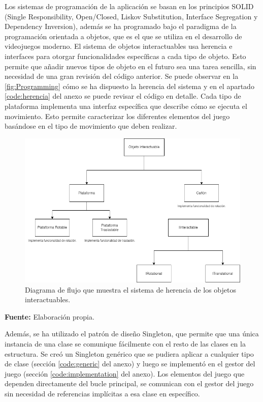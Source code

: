 Los sistemas de programación de la aplicación se basan en los principios SOLID (Single Responsibility, Open/Closed, Liskov Substitution, Interface Segregation y Dependency Inversion), además se ha programado bajo el paradigma de la programación orientada a objetos, que es el que se utiliza en el desarrollo de videojuegos moderno. El sistema de objetos interactuables usa herencia e interfaces para otorgar funcionalidades específicas a cada tipo de objeto. Esto permite que añadir nuevos tipos de objeto en el futuro sea una tarea sencilla, sin necesidad de una gran revisión del código anterior. Se puede observar en la \autoref{fig:Programming} cómo se ha dispuesto la herencia del sistema y en el apartado \ref{code:herencia} del anexo se puede revisar el código en detalle. Cada tipo de plataforma implementa una interfaz específica que describe cómo se ejecuta el movimiento. Esto permite caracterizar los diferentes elementos del juego basándose en el tipo de movimiento que deben realizar.

\begin{figure}[h!]
	\centering
	\includegraphics[width=\linewidth]{Figuras/Desarrollo/Herencia.png}
	\caption{Diagrama de flujo que muestra el sistema de herencia de los objetos interactuables.}
	\label{fig:Programming}
	\vspace{-20pt}
\end{figure}

\begin{center}
	\textbf{Fuente:} Elaboración propia.
\end{center}

Además, se ha utilizado el patrón de diseño Singleton, que permite que una única instancia de una clase se comunique fácilmente con el resto de las clases en la estructura. Se creó un Singleton genérico que se pudiera aplicar a cualquier tipo de clase (sección \ref{code:generic} del anexo) y luego se implementó en el gestor del juego (sección \ref{code:implementation} del anexo). Los elementos del juego que dependen directamente del bucle principal, se comunican con el gestor del juego sin necesidad de referencias implícitas a esa clase en específico.

